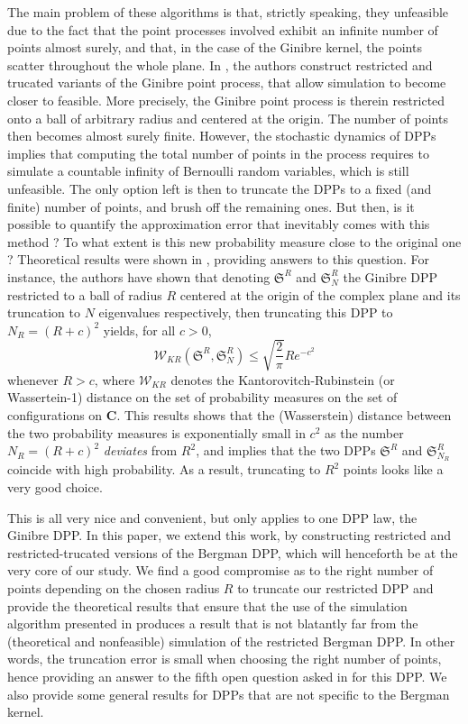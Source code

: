 \documentclass[11pt]{article}
\theoremstyle{plain}
\theoremstyle{definition}
\begin{document}
The main problem of these algorithms is that, strictly speaking, they unfeasible due to the fact that the point processes involved exhibit an infinite number of points almost surely, and that, in the case of the Ginibre kernel, the points scatter throughout the whole plane. In \cite{DecreusefondMoroz2021}, the authors construct restricted and trucated variants of the Ginibre point process, that allow simulation to become closer to feasible. More precisely, the Ginibre point process is therein restricted onto a ball of arbitrary radius and centered at the origin. The number of points then becomes almost surely finite. However, the stochastic dynamics of DPPs implies that computing the total number of points in the process requires to simulate a countable infinity of Bernoulli random variables, which is still unfeasible. The only option left is then to truncate the DPPs to a fixed (and finite) number of points, and brush off the remaining ones. But then, is it possible to quantify the approximation error that inevitably comes with this method ? To what extent is this new probability measure close
to the original one ? Theoretical results were shown in \cite{DecreusefondMoroz2021}, providing answers to this question. For instance, the authors have shown that denoting $\mathfrak S^R $ and $ \mathfrak S^R_N $ the Ginibre DPP restricted to a ball of radius $R$ centered at the origin of the complex plane and its truncation to $N$ eigenvalues respectively, then truncating this DPP to $N_R = (R + c)^2 $ yields, for all $ c > 0 $,
\begin{equation} 
    \mathcal W_{KR} (\mathfrak S^R, \mathfrak S^R_N ) \leqslant \sqrt{\frac 2 \pi } R e^{-c^2} 
\end{equation}
whenever $ R > c$, where $ \mathcal W_{KR} $ denotes the Kantorovitch-Rubinstein (or Wassertein-1) distance on the set of probability measures on the set of configurations on $\mathbf C$. This results shows that the (Wasserstein) distance between the two probability measures is exponentially small in $c^2$ as the number $ N_R = (R+c)^2 $ \textit{deviates} from $ R^2 $, and implies that the two DPPs $ \mathfrak S^R $ and $ \mathfrak S^R_{N_R} $ coincide with high probability. As a result, truncating to $R^2$ points looks like a very good choice. 

This is all very nice and convenient, but only applies to one DPP law, the Ginibre DPP. In this paper, we extend this work, by constructing restricted and restricted-trucated versions of the Bergman DPP, which will henceforth be at the very core of our study. We find a good compromise as to the right number of points depending on the chosen radius $R$ to truncate our restricted DPP and provide the theoretical results that ensure that the use of the simulation algorithm presented in \cite{DecreusefondMoroz2021} produces a result that is not blatantly far from the (theoretical and nonfeasible) simulation of the restricted Bergman DPP. In other words, the truncation error is small when choosing the right number of points, hence providing an answer to the fifth open question asked in \cite{Decreusefond2016} for this DPP. We also provide some general results for DPPs that are not specific to the Bergman kernel.
\end{document}
